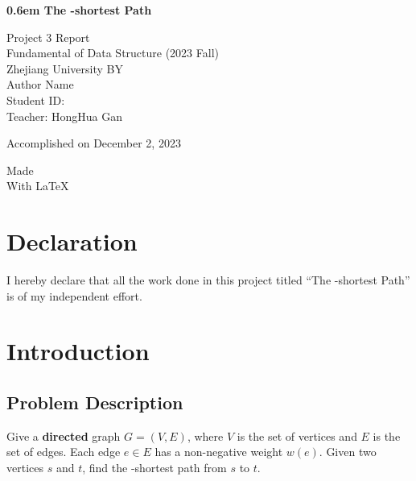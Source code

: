 \documentclass[a4paper,oneside]{book}
\begin{document}
\clearpage
\newcommand\nbvspace[1][3]{\vspace*{\stretch{#1}}}
\newcommand\nbstretchyspace{\spaceskip0.5em plus 0.25em minus 0.25em}
\newcommand{\nbtitlestretch}{\spaceskip0.6em}
\pagestyle{empty}
\begin{center}
    \bfseries
    \nbvspace[1]
    \Huge
    {\nbtitlestretch\huge
        The -shortest Path}

    \nbvspace[1]
    \normalsize

    Project 3 Report\\
    Fundamental of Data Structure (2023 Fall)\\
    Zhejiang University
    \nbvspace[1]
    \small BY\\
    \Large Author Name\\[0.5em]
    \footnotesize Student ID: \\
    Teacher: HongHua Gan

    \nbvspace[2]
    Accomplished on December 2, 2023
    \nbvspace[3]
    \normalsize

    Made\\
    \large
    With \LaTeX
    \nbvspace[1]
\end{center}

\chapter*{Declaration}

I hereby declare that all the work done in this project titled ``The -shortest Path'' is of my independent effort.

\tableofcontents

\chapter{Introduction}

\section{Problem Description}

Give a \textbf{directed} graph $G = (V, E)$, where $V$ is the set of vertices and $E$ is the set of edges. Each edge $e \in E$ has a non-negative weight $w(e)$. Given two vertices $s$ and $t$, find the -shortest path from $s$ to $t$.
\end{document}
